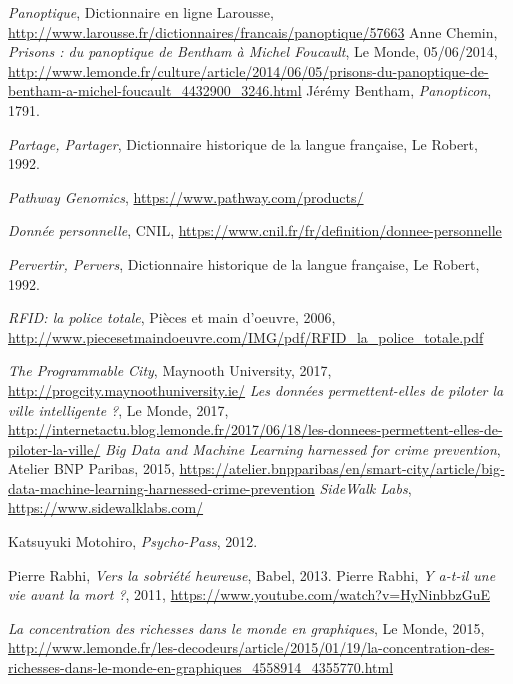 \begin{thebibliography}{99}
     \emph{Panoptique}, Dictionnaire en ligne Larousse, \url{http://www.larousse.fr/dictionnaires/francais/panoptique/57663}
     Anne Chemin, \emph{Prisons : du panoptique de Bentham à Michel Foucault}, Le Monde, 05/06/2014, \url{http://www.lemonde.fr/culture/article/2014/06/05/prisons-du-panoptique-de-bentham-a-michel-foucault_4432900_3246.html}
     Jérémy Bentham, \emph{Panopticon}, 1791.

     \emph{Partage, Partager}, Dictionnaire historique de la langue française, Le Robert, 1992.

     \emph{Pathway Genomics}, \url{https://www.pathway.com/products/}

     \emph{Donnée personnelle}, CNIL, \url{https://www.cnil.fr/fr/definition/donnee-personnelle}

     \emph{Pervertir, Pervers}, Dictionnaire historique de la langue française, Le Robert, 1992.

     \emph{RFID: la police totale}, Pièces et main d'oeuvre, 2006, \url{http://www.piecesetmaindoeuvre.com/IMG/pdf/RFID_la_police_totale.pdf}

     \emph{The Programmable City}, Maynooth University, 2017, \url{http://progcity.maynoothuniversity.ie/}
     \emph{Les données permettent-elles de piloter la ville intelligente ?}, Le Monde, 2017, \url{http://internetactu.blog.lemonde.fr/2017/06/18/les-donnees-permettent-elles-de-piloter-la-ville/}
     \emph{Big Data and Machine Learning harnessed for crime prevention}, Atelier BNP Paribas, 2015, \url{https://atelier.bnpparibas/en/smart-city/article/big-data-machine-learning-harnessed-crime-prevention}
     \emph{SideWalk Labs}, \url{https://www.sidewalklabs.com/}

     Katsuyuki Motohiro, \emph{Psycho-Pass}, 2012.

     Pierre Rabhi, \emph{Vers la sobriété heureuse}, Babel, 2013.
     Pierre Rabhi, \emph{Y a-t-il une vie avant la mort ?}, 2011, \url{https://www.youtube.com/watch?v=HyNinbbzGuE}

     \emph{La concentration des richesses dans le monde en graphiques}, Le Monde, 2015, \url{http://www.lemonde.fr/les-decodeurs/article/2015/01/19/la-concentration-des-richesses-dans-le-monde-en-graphiques_4558914_4355770.html}


\end{thebibliography}
